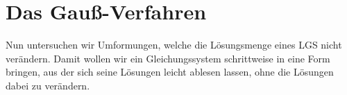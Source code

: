 \section{Das Gauß-Verfahren}
\label{sec:linear_systems_gaussian_elimination}

Nun untersuchen wir Umformungen, welche die Lösungsmenge eines LGS nicht
verändern. Damit wollen wir ein Gleichungssystem schrittweise in eine Form
bringen, aus der sich seine Lösungen leicht ablesen lassen, ohne die Lösungen
dabei zu verändern.





